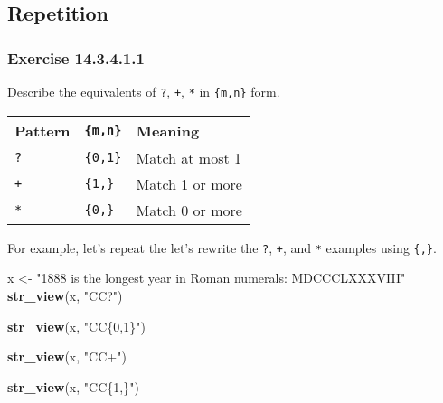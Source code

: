 \documentclass[]{book}
\newenvironment{Shaded}{\begin{snugshade}}{\end{snugshade}}
\newcommand{\KeywordTok}[1]{\textcolor[rgb]{0.13,0.29,0.53}{\textbf{#1}}}
\newcommand{\NormalTok}[1]{#1}
\newcommand{\StringTok}[1]{\textcolor[rgb]{0.31,0.60,0.02}{#1}}
\theoremstyle{plain}
\theoremstyle{remark}
\begin{document}
\hypertarget{repetition}{%
\subsection{Repetition}\label{repetition}}

\hypertarget{exercise-14.3.4.1.1}{%
\subsubsection*{\texorpdfstring{Exercise
{14.3.4.1.1}}{Exercise 14.3.4.1.1}}\label{exercise-14.3.4.1.1}}

Describe the equivalents of \texttt{?}, \texttt{+}, \texttt{*} in
\texttt{\{m,n\}} form.

\begin{longtable}[]{@{}lll@{}}
\toprule
Pattern & \texttt{\{m,n\}} & Meaning\tabularnewline
\midrule
\endhead
\texttt{?} & \texttt{\{0,1\}} & Match at most 1\tabularnewline
\texttt{+} & \texttt{\{1,\}} & Match 1 or more\tabularnewline
\texttt{*} & \texttt{\{0,\}} & Match 0 or more\tabularnewline
\bottomrule
\end{longtable}

For example, let's repeat the let's rewrite the \texttt{?}, \texttt{+},
and \texttt{*} examples using \texttt{\{,\}}.

\begin{Shaded}
\begin{Highlighting}[]
\NormalTok{x <-}\StringTok{ "1888 is the longest year in Roman numerals: MDCCCLXXXVIII"}
\KeywordTok{str_view}\NormalTok{(x, }\StringTok{"CC?"}\NormalTok{)}
\end{Highlighting}
\end{Shaded}

\begin{Shaded}
\begin{Highlighting}[]
\KeywordTok{str_view}\NormalTok{(x, }\StringTok{"CC\{0,1\}"}\NormalTok{)}
\end{Highlighting}
\end{Shaded}

\begin{Shaded}
\begin{Highlighting}[]
\KeywordTok{str_view}\NormalTok{(x, }\StringTok{"CC+"}\NormalTok{)}
\end{Highlighting}
\end{Shaded}

\begin{Shaded}
\begin{Highlighting}[]
\KeywordTok{str_view}\NormalTok{(x, }\StringTok{"CC\{1,\}"}\NormalTok{)}
\end{Highlighting}
\end{Shaded}
\end{document}
